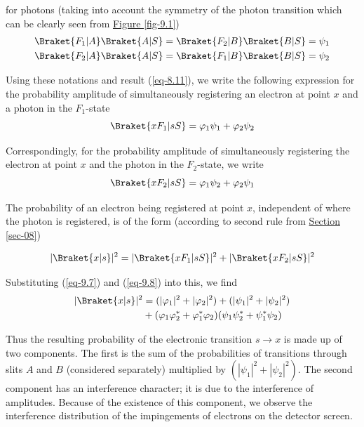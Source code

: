 \documentclass[a4paper,sfsidenotes,colorlinks=true]{tufte-book}
\numberwithin{equation}{section}
\numberwithin{figure}{section}
\begin{document}
for photons (taking into account the symmetry of the photon transition which can be clearly seen from \hyperref[fig-9.1]{Figure \ref{fig-9.1}})
\begin{equation}%
\begin{split}
\Braket{F_{1}|A}\Braket{A|S}  = \Braket{F_{2}|B}\Braket{B|S} & = \psi_{1} \\
\Braket{F_{2}|A}\Braket{A|S}  = \Braket{F_{1}|B}\Braket{B|S} & = \psi_{2} 
\end{split}
\label{eq-9.6}
\end{equation}

Using these notations and result (\ref{eq-8.11}), we write the following expression for the probability amplitude of simultaneously registering an electron at point $x$ and a photon in the $F_{1}$-state
\begin{equation}%
\Braket{xF_{1}| sS} = \varphi_{1} \psi_{1} + \varphi_{2} \psi_{2}
\label{eq-9.7}
\end{equation}

Correspondingly, for the probability amplitude of simultaneously registering the electron at point $x$ and the photon in the $F_{2}$-state, we write
\begin{equation}%
\Braket{xF_{2}| sS} = \varphi_{1} \psi_{2} + \varphi_{2} \psi_{1}
\label{eq-9.8}
\end{equation}

The probability of an electron being registered at point $x$, independent of where the photon is registered, is of the form (according to second rule from \hyperref[sec-08]{Section \ref{sec-08}})

\begin{equation}%
|\Braket{x| s}|^{2} = |\Braket{xF_{1}| sS}|^{2} + |\Braket{xF_{2}| sS}|^{2}
\label{eq-9.9}
\end{equation}

Substituting (\ref{eq-9.7}) and (\ref{eq-9.8}) into this, we find
\begin{equation}%
\begin{split}
|\Braket{x| s}|^{2} & =  (|\varphi_{1}|^{2}+|\varphi_{2}|^{2}) +
(|\psi_{1}|^{2}+|\psi_{2}|^{2})\\
& + (\varphi_{1}\varphi_{2}^{*}+\varphi_{1}^{*}\varphi_{2})(\psi_{1}\psi_{2}^{*}
+ \psi_{1}^{*}\psi_{2})
\end{split}
\label{eq-9.10}
\end{equation}

Thus the resulting probability of the electronic transition $s \to x$
is made up of two components. The first is the sum of the
probabilities of transitions through slits $A$ and $B$ (considered
separately) multiplied by $(|\psi_{1}|^{2}+|\psi_{2}|^{2})$. The
second component has an interference character; it is due to the
interference of amplitudes. Because of the existence of this
component, we observe the interference distribution of the
impingements of electrons on the detector screen.
\end{document}
